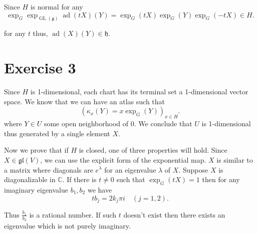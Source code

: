 \documentclass{article}
\numberwithin{equation}{section}
\DeclareMathOperator{\ad}{ad}
\DeclareMathOperator{\GL}{GL}
\begin{document}
Since $H$ is normal for any 
\begin{equation*}
\exp_G\exp_{\GL(\mathfrak{g})}\ad(tX)(Y) = \exp_G(tX)\exp_G(Y)\exp_G(-tX)\in H.
\end{equation*}

for any $t$ thus, $\ad(X)(Y)\in\mathfrak{h}$.


\section*{Exercise 3}
Since $H$ is 1-dimensional, each chart has its terminal set a 1-dimensional vector space. We know that we can have an atlas such that
\begin{equation*}
(\kappa_x(Y)=x\exp_G(Y))_{x\in H}.
\end{equation*}
where $Y\in U$ some open neighborhood of $0$. We conclude that $U$ is 1-dimensional thus generated by a single element $X$.\\
\par Now we prove that if $H$ is closed, one of three properties will hold. Since $X\in\mathfrak{gl}(V)$, we can use the explicit form of the exponential map. $X$ is similar to a matrix where diagonals are $e^\lambda$ for an eigenvalue $\lambda$ of $X$. Suppose $X$ is diagonalizable in $\mathbb{C}$. If there is $t\not=0$ such that $\exp_G(tX)=1$ then for any imaginary eigenvalue $b_1,b_2$ we have
\begin{equation*}
tb_j = 2k_j\pi i\quad(j=1,2).
\end{equation*}

Thus ${\frac {b_1} {b_2}}$ is a rational number. If such $t$ doesn't exist then there exists an eigenvalue which is not purely imaginary. 
\end{document}
